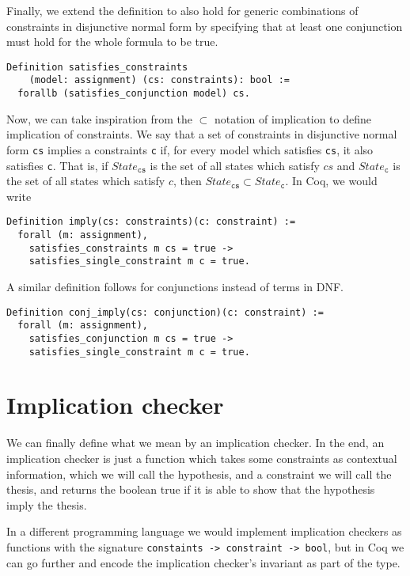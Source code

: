 Finally, we extend the definition to also hold for generic combinations of constraints in disjunctive 
normal form by specifying that at least one conjunction must hold for the whole formula to be true.

\begin{verbatim}
Definition satisfies_constraints 
    (model: assignment) (cs: constraints): bool :=
  forallb (satisfies_conjunction model) cs.
\end{verbatim}

Now, we can take inspiration from the $\subset$ notation of implication to define implication of 
constraints. We say that a set of constraints in disjunctive normal form \texttt{cs} implies a constraints \texttt{c} if,
for every model which satisfies \texttt{cs}, it also satisfies \texttt{c}. That is, if $State_{\texttt{cs}}$ is the set of
all states which satisfy $cs$ and $State_{\texttt{c}}$ is the set of all states which satisfy $c$, then
$State_{\texttt{cs}} \subset State_{\texttt{c}}$. In Coq, we would write

\begin{verbatim}
Definition imply(cs: constraints)(c: constraint) := 
  forall (m: assignment),
    satisfies_constraints m cs = true ->
    satisfies_single_constraint m c = true.
\end{verbatim}

A similar definition follows for conjunctions instead of terms in DNF.
\begin{verbatim}
Definition conj_imply(cs: conjunction)(c: constraint) := 
  forall (m: assignment),
    satisfies_conjunction m cs = true ->
    satisfies_single_constraint m c = true.
\end{verbatim}

\section{Implication checker}

We can finally define what we mean by an implication checker. In the end, an implication checker is 
just a function which takes some constraints as contextual information, which we will call the 
hypothesis, and a constraint we will call the thesis, and returns the boolean true if it is able to 
show that the hypothesis imply the thesis.

In a different programming language we would implement implication checkers as functions with the 
signature \texttt{constaints -> constraint -> bool}, but in Coq we can go further and encode 
the implication checker's invariant as part of the type.

